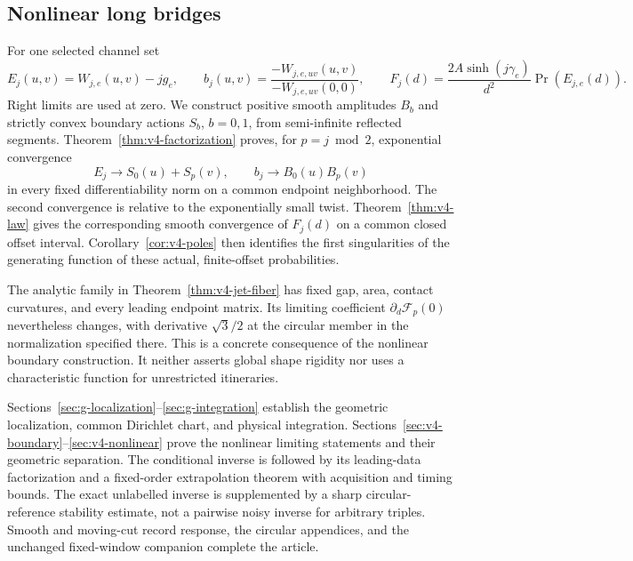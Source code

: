 \subsection{Nonlinear long bridges}
For one selected channel set
\[
 E_j(u,v)=W_{j,e}(u,v)-jg_e,\qquad
 b_j(u,v)=\frac{-W_{j,e,uv}(u,v)}{-W_{j,e,uv}(0,0)},\qquad
 F_j(d)=\frac{2A\sinh(j\gamma_e)}{d^2}\Pr(E_{j,e}(d)).
\]
Right limits are used at zero. We construct positive smooth amplitudes
$B_b$ and strictly convex boundary actions $S_b$, $b=0,1$, from
semi-infinite reflected segments. Theorem~\ref{thm:v4-factorization}
proves, for $p=j\bmod2$, exponential convergence
\[
 E_j\longrightarrow S_0(u)+S_p(v),\qquad
 b_j\longrightarrow B_0(u)B_p(v)
\]
in every fixed differentiability norm on a common endpoint neighborhood.
The second convergence is relative to the exponentially small twist.
Theorem~\ref{thm:v4-law} gives the corresponding smooth convergence of
$F_j(d)$ on a common closed offset interval. Corollary~\ref{cor:v4-poles}
then identifies the first singularities of the generating function of
these actual, finite-offset probabilities.

The analytic family in Theorem~\ref{thm:v4-jet-fiber} has fixed gap,
area, contact curvatures, and every leading endpoint matrix. Its limiting
coefficient $\partial_d\mathcal F_p(0)$ nevertheless changes, with derivative
$\sqrt3/2$ at the circular member in the normalization specified there.
This is a concrete consequence of the nonlinear boundary construction.
It neither asserts global shape rigidity nor uses a characteristic
function for unrestricted itineraries.

Sections~\ref{sec:g-localization}--\ref{sec:g-integration} establish
the geometric localization, common Dirichlet chart, and physical
integration. Sections~\ref{sec:v4-boundary}--\ref{sec:v4-nonlinear}
prove the nonlinear limiting statements and their geometric separation.
The conditional inverse is followed by its leading-data factorization
and a fixed-order extrapolation theorem with acquisition and timing
bounds. The exact unlabelled inverse is supplemented by a sharp
circular-reference stability estimate, not a pairwise noisy inverse for
arbitrary triples. Smooth and moving-cut record response, the circular
appendices, and the unchanged fixed-window companion complete the
article.
